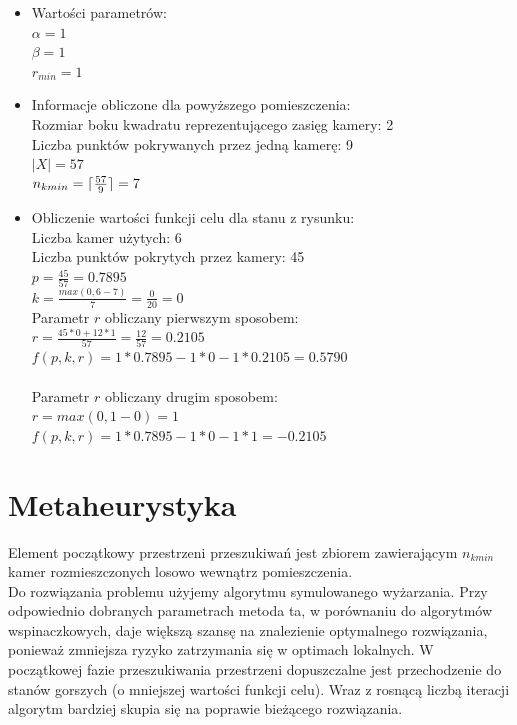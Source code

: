 \documentclass[12pt,a4paper]{article}
\DeclarePairedDelimiter{\ceil}{\lceil}{\rceil}
\begin{document}
\begin{itemize}
	\item Wartości parametrów:\\
	$\alpha = 1$\\
	$\beta = 1$\\
	$r_{min} = 1$
	\item Informacje obliczone dla powyższego pomieszczenia:\\
	Rozmiar boku kwadratu reprezentującego zasięg kamery: 2\\
	Liczba punktów pokrywanych przez jedną kamerę: 9\\
	$|X| = 57$\\
	$n_{kmin} = \ceil{\frac{57}{9}} = 7$\\

	\item Obliczenie wartości funkcji celu dla stanu z rysunku:\\
	Liczba kamer użytych: 6\\
	Liczba punktów pokrytych przez kamery: 45\\
	$p = \frac{45}{57} = 0.7895$\\
	$k = \frac{max(0, 6-7)}{7} = \frac{0}{20} = 0$\\
	Parametr $r$ obliczany pierwszym sposobem:\\
	$r = \frac{45*0 + 12*1}{57} = \frac{12}{57} = 0.2105$\\
	$f(p, k, r) = 1*0.7895 - 1*0 - 1*0.2105 = 0.5790$\\\\
	Parametr $r$ obliczany drugim sposobem:\\
	$r = max(0, 1-0) = 1$\\
	$f(p, k, r) = 1*0.7895 - 1*0 - 1*1 = -0.2105$
\end{itemize}

\section{Metaheurystyka}
Element początkowy przestrzeni przeszukiwań jest zbiorem zawierającym $n_{kmin}$ kamer rozmieszczonych losowo wewnątrz pomieszczenia.\\
Do rozwiązania problemu użyjemy algorytmu symulowanego wyżarzania. Przy odpowiednio dobranych parametrach metoda ta, w porównaniu do algorytmów wspinaczkowych, daje większą szansę na znalezienie optymalnego rozwiązania, ponieważ zmniejsza ryzyko zatrzymania się w optimach lokalnych. W początkowej fazie przeszukiwania przestrzeni dopuszczalne jest przechodzenie do stanów gorszych (o mniejszej wartości funkcji celu). Wraz z rosnącą liczbą iteracji algorytm bardziej skupia się na poprawie bieżącego rozwiązania.
\end{document}
